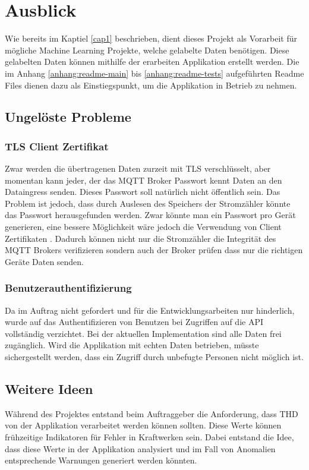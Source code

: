 \chapter{Ausblick}
Wie bereits im Kaptiel \ref{cap1} beschrieben, dient dieses Projekt als Vorarbeit für mögliche
Machine Learning Projekte, welche gelabelte Daten benötigen.
Diese gelabelten Daten können mithilfe der erarbeiten Applikation erstellt werden.
Die im Anhang \ref{anhang:readme-main} bis \ref{anhang:readme-tests} aufgeführten Readme Files dienen dazu als Einstiegspunkt,
um die Applikation in Betrieb zu nehmen.



\section{Ungelöste Probleme}

\subsection{\ac{TLS} Client Zertifikat}

Zwar werden die übertragenen Daten zurzeit mit \ac{TLS} verschlüsselt, aber
momentan kann jeder, der das \ac{MQTT} Broker Passwort kennt Daten an den
Dataingress senden. Dieses Passwort soll natürlich nicht öffentlich sein.
Das Problem ist jedoch, dass durch Auslesen des Speichers der Stromzähler
könnte das Passwort herausgefunden werden.
Zwar könnte man ein Passwort pro Gerät generieren, eine bessere Möglichkeit
wäre jedoch die Verwendung von Client Zertifikaten \parencite{rfc5246_2021}.
Dadurch können nicht nur die Stromzähler die Integrität des \ac{MQTT} Brokers
verifizieren sondern auch der Broker prüfen dass nur die richtigen Geräte
Daten senden.

\subsection{Benutzerauthentifizierung}
Da im Auftrag nicht gefordert und für die Entwicklungsarbeiten nur hinderlich,
wurde auf das Authentifizieren von Benutzen bei Zugriffen auf die \ac{API} vollständig verzichtet.
Bei der aktuellen Implementation sind alle Daten frei zugänglich.
Wird die Applikation mit echten Daten betrieben, müsste sichergestellt werden, dass ein Zugriff durch unbefugte
Personen nicht möglich ist.



\section{Weitere Ideen}
Während des Projektes entstand beim Auftraggeber die Anforderung, dass \ac{THD} von der Applikation
verarbeitet werden können sollten. Diese Werte können frühzeitige Indikatoren für Fehler in Kraftwerken sein.
Dabei entstand die Idee, dass diese Werte in der Applikation analysiert
und im Fall von Anomalien entsprechende Warnungen generiert werden könnten.

